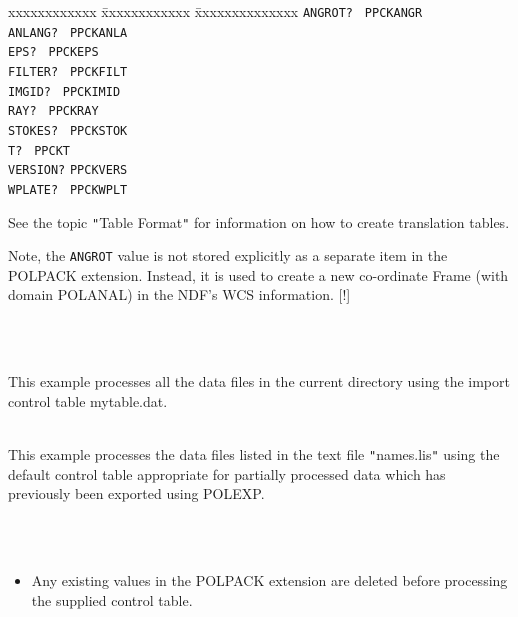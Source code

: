 \documentclass[twoside,11pt]{article}
\newcommand{\htmlref}[2]{#1}
\renewcommand{\_}{\texttt{\symbol{95}}}
\newlength{\sstexampleslength}
\newcommand{\sstexamples}[1]{
   \item[Examples:] \mbox{} \\
   \vspace{-3.5ex}
   \begin{description}
      #1
   \end{description}
}
\newcommand{\sstexamplesubsection}[2]{\sloppy
\item[\parbox{\sstexampleslength}{\ssttt #1}] \mbox{} \vspace{1.0ex}
\\ #2 }
\newcommand{\sstnotes}[1]{\item[Notes:] \mbox{} \\[1.3ex] #1}
\newcommand{\sstitemlist}[1]{
  \mbox{} \\
  \vspace{-3.5ex}
  \begin{itemize}
     #1
  \end{itemize}
}
\newcommand{\sstitem}{\item}
\newcommand{\sstexamples}[1]{
      \item[Examples:] \\
      \begin{description}
         #1
      \end{description}
      \\
   }
\newcommand{\sstexamplesubsection}[2]{\item[{\ssttt #1}] #2}
\newcommand{\sstnotes}[1]{\item[Notes:] #1 }
\newcommand{\sstitemlist}[1]{
      \begin{itemize}
         #1
      \end{itemize}
      \\
   }
\newcommand{\sstitem}{\item}
\begin{document}
{{{\begin{tabbing}
 xxxxxxxxxxxx \= xxxxxxxxxxxx          \= xxxxxxxxxxxxxx \kill
              \>  \texttt{ANGROT? }    \> \texttt{PPCKANGR}  \\
              \>  \texttt{ANLANG? }    \> \texttt{PPCKANLA} \\
              \>  \texttt{EPS?    }    \> \texttt{PPCKEPS} \\
              \>  \texttt{FILTER? }    \> \texttt{PPCKFILT} \\
              \>  \texttt{IMGID?  }    \> \texttt{PPCKIMID} \\
              \>  \texttt{RAY?    }    \> \texttt{PPCKRAY} \\
              \>  \texttt{STOKES? }    \> \texttt{PPCKSTOK} \\
              \>  \texttt{T?      }    \> \texttt{PPCKT} \\
              \>  \texttt{VERSION?}    \> \texttt{PPCKVERS} \\
              \>  \texttt{WPLATE? }    \> \texttt{PPCKWPLT}
\end{tabbing}

         See the topic {\tt "}Table Format{\tt "} for information on how 
         to create translation tables. 

         Note, the \texttt{ANGROT} value is not stored explicitly as a
         separate item in the POLPACK extension. Instead, it is used to
         create a new co-ordinate Frame (with domain POLANAL) in the NDF's 
         WCS information. [!]
      }
   }
   \sstexamples{
      \sstexamplesubsection{
         polimp in={\tt '}$*${\tt '} table=mytable.dat
      }{
         This example processes all the data files in the current directory
         using the import control table mytable.dat.
      }
      \sstexamplesubsection{
         polimp in=$\wedge$names.lis
      }{
         This example processes the data files listed in the text file
         {\tt "}names.lis{\tt "} using the default control table appropriate for
         partially processed data which has previously been exported using
         \htmlref{POLEXP}{POLEXP}.
      }
   }
   \sstnotes{
      \sstitemlist{

         \sstitem
         Any existing values in the POLPACK extension are deleted before
         processing the supplied control table.

}}}
\end{document}
